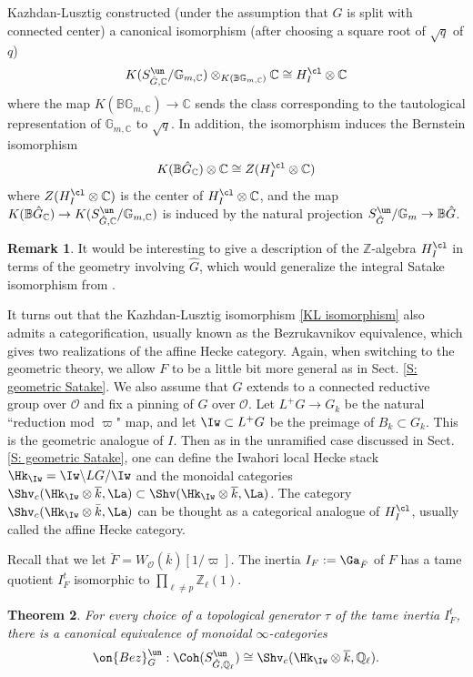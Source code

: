 \documentclass[11pt]{amsart}
\newtheorem{thm}{Theorem}[subsection]
\theoremstyle{definition}
\theoremstyle{definition}
\newtheorem{rmk}[thm]{Remark}
\theoremstyle{definition}
\numberwithin{equation}{section}
\newcommand{\bB}{{\mathbb B}}
\newcommand{\bC}{{\mathbb C}}
\newcommand{\bG}{{\mathbb G}}
\newcommand{\bQ}{{\mathbb Q}}
\newcommand{\bZ}{{\mathbb Z}}
\newcommand{\mO}{{\mathcal O}}
\begin{document}
Kazhdan-Lusztig \cite{Kazhdan-Lusztig-Iwahori} constructed (under the assumption that $G$ is split with connected center) a canonical isomorphism (after choosing a square root of $\sqrt{q}$ of $q$)
\begin{equation}\label{KL isomorphism}
K(S^{\un}_{\hat{G},\bC}/\bG_{m,\bC})\otimes_{K(\bB\bG_{m,\bC})}\bC\cong H^{\cl}_I\otimes\bC
\end{equation}
where the map $K(\bB\bG_{m,\bC})\to \bC$ sends the class corresponding to the tautological representation of $\bG_{m,\bC}$ to $\sqrt{q}$. In addition, the isomorphism induces the Bernstein isomorphism
\begin{equation}\label{Bernstein isomorphism}
K(\bB \hat{G}_\bC)\otimes\bC\cong Z(H^{\cl}_I\otimes\bC)
\end{equation}
where $Z(H^{\cl}_I\otimes\bC)$ is the center of $H^{\cl}_I\otimes\bC$, and the map $K(\bB \hat{G}_\bC)\to K(S^{\un}_{\hat{G},\bC}/\bG_{m,\bC})$ is
induced by the natural projection $S^{\un}_{\hat{G}}/\bG_m\to \bB\hat{G}$.

\begin{rmk}
It would be interesting to give a description of the $\bZ$-algebra $H^{\cl}_I$ in terms of the geometry involving $\hat{G}$, which would generalize the integral Satake isomorphism from \cite{Zhu-Integral-Satake}.
\end{rmk}

It turns out that the Kazhdan-Lusztig isomorphism \eqref{KL isomorphism} also admits a categorification, usually known as the Bezrukavnikov equivalence, which gives two realizations of the affine Hecke category. Again, when switching to the geometric theory, we allow $F$ to be a little bit more general as in Sect. \ref{S: geometric Satake}. We also assume that $G$ extends to a connected reductive group over $\mO$ and fix a pinning of $G$ over $\mO$.
Let $L^+G\to G_k$ be the natural ``reduction mod $\varpi$" map, and let $\Iw\subset L^+G$ be the preimage of $B_k\subset G_k$. 
This is the geometric analogue of $I$. 
Then as in the unramified case discussed in Sect. \ref{S: geometric Satake}, one can define the Iwahori local Hecke stack $\Hk_{\Iw}= \Iw\backslash LG/\Iw$ and the monoidal categories 
$\Shv_{c}(\Hk_{\Iw}\otimes\overline k,\La)\subset\Shv(\Hk_{\Iw}\otimes\overline k,\La)$. The category $\Shv_{c}(\Hk_{\Iw}\otimes\bar k,\La)$ can be thought as a categorical analogue of $H^{\cl}_I$, usually called the affine Hecke category. 

Recall that we let $\breve F=W_\mO(\overline k)[1/\varpi]$. The inertia $I_F:=\Ga_{\breve F}$ of $F$ has a tame quotient $I_F^t$ isomorphic to $ \prod_{\ell\neq p} \bZ_\ell(1)$.
\begin{thm} \label{T: Bezrukavnikov equivalence}
For every choice of a topological generator $\tau$ of the tame inertia $I_F^t$,
there is a canonical equivalence of monoidal $\infty$-categories
\[
\on{Bez}^{\un}_G:   \Coh(S^{\un}_{\hat{G},\bQ_\ell})\cong \Shv_{c}(\Hk_{\Iw}\otimes\overline k,\bQ_\ell).
\]
\end{thm}
\end{document}
